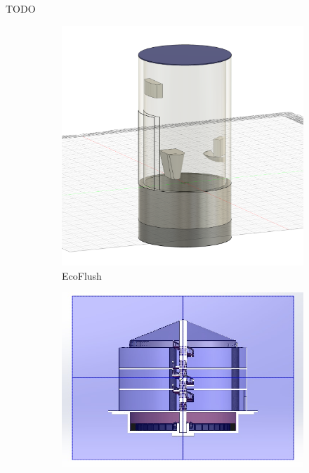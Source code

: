 \documentclass{PDS}
\begin{document}
TODO

\begin{figure}[htbp]
    \begin{subfigure}[b]{0.27\textwidth}
        \includegraphics[width=\textwidth]{./figures/ecoflush.png}
        \caption{EcoFlush}
    \end{subfigure}
    \hfill
    \begin{subfigure}[b]{0.375\textwidth}
        \includegraphics[width=\textwidth]{./figures/golazo-1.jpg}

\end{subfigure}
\end{figure}
\end{document}
